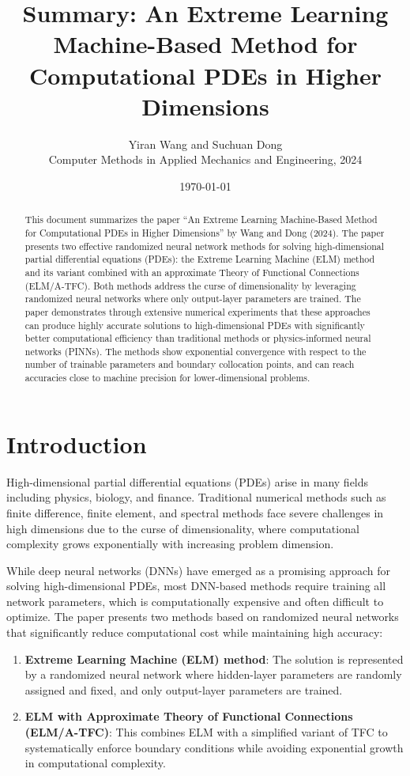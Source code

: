 \documentclass[11pt]{article}
\title{Summary: An Extreme Learning Machine-Based Method for\\Computational PDEs in Higher Dimensions}
\author{Yiran Wang and Suchuan Dong\\Computer Methods in Applied Mechanics and Engineering, 2024}
\date{\today}
\begin{document}
\maketitle

\begin{abstract}
This document summarizes the paper ``An Extreme Learning Machine-Based Method for Computational PDEs in Higher Dimensions'' by Wang and Dong (2024). The paper presents two effective randomized neural network methods for solving high-dimensional partial differential equations (PDEs): the Extreme Learning Machine (ELM) method and its variant combined with an approximate Theory of Functional Connections (ELM/A-TFC). Both methods address the curse of dimensionality by leveraging randomized neural networks where only output-layer parameters are trained. The paper demonstrates through extensive numerical experiments that these approaches can produce highly accurate solutions to high-dimensional PDEs with significantly better computational efficiency than traditional methods or physics-informed neural networks (PINNs). The methods show exponential convergence with respect to the number of trainable parameters and boundary collocation points, and can reach accuracies close to machine precision for lower-dimensional problems.
\end{abstract}

\section{Introduction}

High-dimensional partial differential equations (PDEs) arise in many fields including physics, biology, and finance. Traditional numerical methods such as finite difference, finite element, and spectral methods face severe challenges in high dimensions due to the curse of dimensionality, where computational complexity grows exponentially with increasing problem dimension.

While deep neural networks (DNNs) have emerged as a promising approach for solving high-dimensional PDEs, most DNN-based methods require training all network parameters, which is computationally expensive and often difficult to optimize. The paper presents two methods based on randomized neural networks that significantly reduce computational cost while maintaining high accuracy:

\begin{enumerate}
    \item \textbf{Extreme Learning Machine (ELM) method}: The solution is represented by a randomized neural network where hidden-layer parameters are randomly assigned and fixed, and only output-layer parameters are trained.
    
    \item \textbf{ELM with Approximate Theory of Functional Connections (ELM/A-TFC)}: This combines ELM with a simplified variant of TFC to systematically enforce boundary conditions while avoiding exponential growth in computational complexity.
\end{enumerate}
\end{document}
